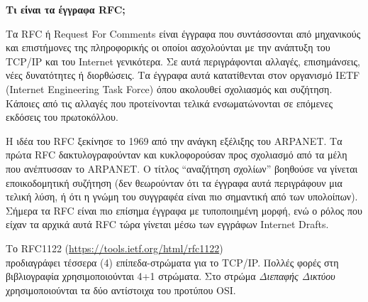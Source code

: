 \begin{inthebox}
\textbf{Τι είναι τα έγγραφα RFC;}

Τα RFC ή Request For Comments είναι έγγραφα που συντάσσονται από μηχανικούς και επιστήμονες της πληροφορικής οι οποίοι ασχολούνται με την ανάπτυξη του TCP/IP και του Internet γενικότερα. Σε αυτά περιγράφονται αλλαγές, επισημάνσεις, νέες δυνατότητες ή διορθώσεις. Τα έγγραφα αυτά κατατίθενται στον οργανισμό IETF (Internet Engineering Task Force) όπου ακολουθεί σχολιασμός και συζήτηση. Κάποιες από τις αλλαγές που προτείνονται τελικά ενσωματώνονται σε επόμενες εκδόσεις του πρωτοκόλλου. 

Η ιδέα του RFC ξεκίνησε το 1969 από την ανάγκη εξέλιξης του ARPANET. Τα πρώτα RFC δακτυλογραφούνταν και κυκλοφορούσαν προς σχολιασμό από τα μέλη που ανέπτυσσαν το ARPANET. Ο τίτλος ``αναζήτηση σχολίων'' βοηθούσε να γίνεται εποικοδομητική συζήτηση (δεν θεωρούνταν ότι τα έγγραφα αυτά περιγράφουν μια τελική λύση, ή ότι η γνώμη του συγγραφέα είναι πιο σημαντική από των υπολοίπων). Σήμερα τα RFC είναι πιο επίσημα έγγραφα με τυποποιημένη μορφή, ενώ ο ρόλος που είχαν τα αρχικά αυτά RFC τώρα γίνεται μέσω των εγγράφων Internet Drafts.\\
\end{inthebox}

Το RFC1122 (\url{https://tools.ietf.org/html/rfc1122})\\ προδιαγράφει τέσσερα (4) επίπεδα-στρώματα για το TCP/IP. Πολλές φορές στη βιβλιογραφία χρησιμοποιούνται 4+1 στρώματα. Στο στρώμα \emph{Διεπαφής Δικτύου} χρησιμοποιούνται τα δύο αντίστοιχα του προτύπου OSI.

